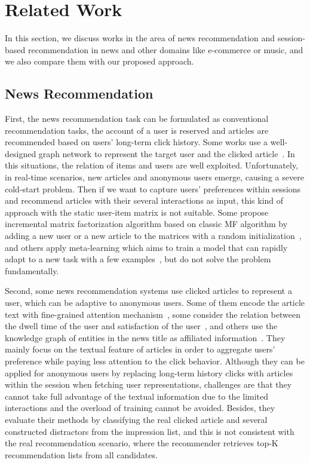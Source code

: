 \section{Related Work}
In this section, we discuss works in the area of news recommendation and session-based recommendation in news and other domains like e-commerce or music, and we also compare them with our proposed approach.

\subsection{News Recommendation}
First, the news recommendation task can be formulated as conventional recommendation tasks, the account of a user is reserved and articles are recommended based on users' long-term click history. Some works use a well-designed graph network to represent the target user and the clicked article~\cite{hu2020graph,ge2020graph}.
In this situations, the relation of items and users are well exploited. Unfortunately, in real-time scenarios, new articles and anonymous users emerge, causing a severe cold-start problem. Then if we want to capture users' preferences
within sessions and recommend articles with their several interactions as input, this kind of approach with the static user-item matrix is not suitable. Some propose incremental matrix factorization algorithm based on classic MF algorithm by adding a new user or a new article to the matrices with a random initialization~\cite{al2018adaptive}, and others apply meta-learning which aims to train a model that can rapidly adapt to a new task with a few examples~\cite{lee_melu:_2019}, but do not solve the problem fundamentally.

Second, some news recommendation systems use clicked articles to represent a user, which can be adaptive to anonymous users. Some of them encode the article text with fine-grained attention mechanism~\cite{zhu2019dan,wu_neural_2019-1,wu2019npa,wang2020fine}, some consider the relation between the dwell time of the user and satisfaction of the user~\cite{wu2020CPRS}, and others use the knowledge graph of entities in the news title as affiliated information~\cite{wang2018dkn,wang_ripplenet:_2018}. They mainly focus on the textual feature of articles in order to aggregate users' preference while paying less attention to the click behavior. Although they can be applied for anonymous users by replacing long-term history clicks with articles within the session when fetching user representations, challenges are that they cannot take full advantage of the textual information due to the limited interactions and the overload of training cannot be avoided. Besides, they evaluate their methods by classifying the real clicked article and several constructed distractors from the impression list, and this is not consistent with the real recommendation scenario, where the recommender retrieves top-K recommendation lists from all candidates.

